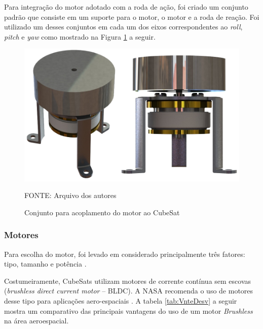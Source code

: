 \documentclass[
	12pt,				%
	openany,			%
	twoside,			%
	a4paper,			%
	english,			%
	french,				%
	spanish,			%
	brazil,				%
	oldfontcommands
	]{abntex2}
\begin{document}
Para integração do motor adotado com a roda de ação, foi criado um conjunto padrão que consiste em um suporte para o motor, o motor e a roda de reação. Foi utilizado um desses conjuntos em cada um dos eixos correspondentes ao \textit{roll}, \textit{pitch} e \textit{yaw} como mostrado na Figura \ref{fig:MotSet} a seguir.

\begin{figure}[th]
	\caption{Conjunto para acoplamento do motor ao CubeSat}
	\centering
	\includegraphics[width=0.69\linewidth]{./figs/Motor_Set}
	
	\begin{small}
		FONTE: Arquivo dos autores
	\end{small}
	\label{fig:MotSet}
\end{figure}

\subsubsection{Motores}

Para escolha do motor, foi levado em considerado principalmente três fatores: tipo, tamanho e potência \cite{Ericksson}.

Costumeiramente, CubeSats utilizam motores de corrente contínua sem escovas (\textit{brushless direct current motor} – BLDC). A NASA recomenda o uso de motores desse tipo para aplicações aero-espaciais \cite{NASABLDC}. A tabela \ref{tab:VnteDesv} a seguir mostra um comparativo das principais vantagens do uso de um motor \textit{Brushless} na área aeroespacial.
\end{document}
